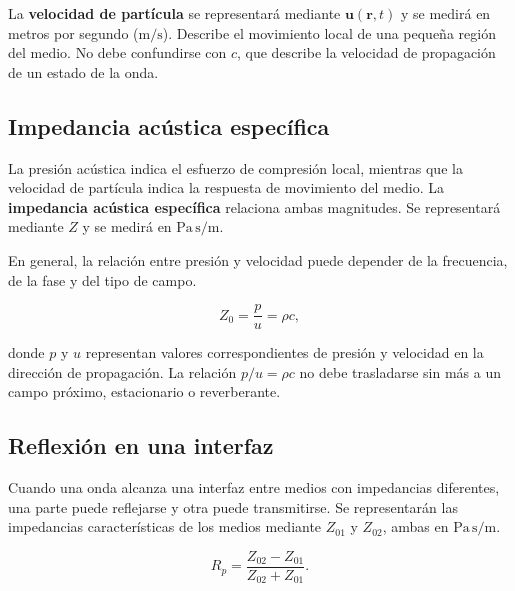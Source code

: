 La \textbf{velocidad de partícula} se representará mediante
\(\mathbf u(\mathbf r,t)\) y se medirá en metros por segundo
(\(\text{m}/\text{s}\)). Describe el movimiento local de una pequeña región
del medio. No debe confundirse con \(c\), que describe la velocidad de
propagación de un estado de la onda.

\subsection{Impedancia acústica específica}
\label{sec:u4-impedancia}

La presión acústica indica el esfuerzo de compresión local, mientras que la
velocidad de partícula indica la respuesta de movimiento del medio. La
\textbf{impedancia acústica específica} relaciona ambas magnitudes. Se
representará mediante \(Z\) y se medirá en
\(\text{Pa}\,\text{s}/\text{m}\).

En general, la relación entre presión y velocidad puede depender de la
frecuencia, de la fase y del tipo de campo. 

\begin{equation}
    Z_0=\frac{p}{u}=\rho c,
    \label{eq:u4-impedancia-caracteristica}
\end{equation}

donde \(p\) y \(u\) representan valores correspondientes de presión y
velocidad en la dirección de propagación. La relación
\(p/u=\rho c\) no debe trasladarse sin más a un campo próximo, estacionario o
reverberante.

\subsection{Reflexión en una interfaz}
\label{sec:u4-reflexion}

Cuando una onda alcanza una interfaz entre medios con impedancias diferentes,
una parte puede reflejarse y otra puede transmitirse. Se representarán las
impedancias características de los medios mediante \(Z_{01}\) y \(Z_{02}\),
ambas en \(\text{Pa}\,\text{s}/\text{m}\).


\begin{equation}
    R_p=\frac{Z_{02}-Z_{01}}{Z_{02}+Z_{01}}.
    \label{eq:u4-reflexion-presion}
\end{equation}

